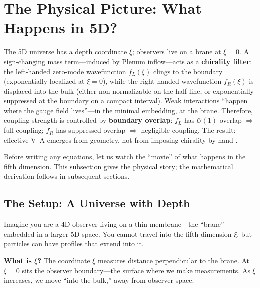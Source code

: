 \section{The Physical Picture: What Happens in 5D?}
\label{sec:ch9_physical_picture}

\begin{tcolorbox}[colback=green!5!white, colframe=green!50!black,
    title=\textbf{The V--A Mechanism in One Paragraph}]
The 5D universe has a depth coordinate $\xi$; observers live on a brane at $\xi = 0$.
A sign-changing mass term---induced by Plenum inflow---acts as a \textbf{chirality
filter}: the left-handed zero-mode wavefunction $f_L(\xi)$ clings to the boundary
(exponentially localized at $\xi = 0$), while the right-handed wavefunction $f_R(\xi)$
is displaced into the bulk (either non-normalizable on the half-line, or
exponentially suppressed at the boundary on a compact interval). Weak interactions
``happen where the gauge field lives''---in the minimal embedding, at the brane.
Therefore, coupling strength is controlled by \textbf{boundary overlap}: $f_L$ has
$\mathcal{O}(1)$ overlap $\Rightarrow$ full coupling; $f_R$ has suppressed overlap
$\Rightarrow$ negligible coupling. The result: effective V--A emerges from geometry,
not from imposing chirality by hand \tagDc{}.
\end{tcolorbox}

\medskip
Before writing any equations, let us watch the ``movie'' of what happens in the
fifth dimension. This subsection gives the physical story; the mathematical
derivation follows in subsequent sections.


\subsection{The Setup: A Universe with Depth}

Imagine you are a 4D observer living on a thin membrane---the ``brane''---embedded
in a larger 5D space. You cannot travel into the fifth dimension $\xi$, but particles
can have profiles that extend into it.

\textbf{What is $\xi$?} The coordinate $\xi$ measures distance perpendicular to the
brane. At $\xi = 0$ sits the observer boundary---the surface where we make measurements.
As $\xi$ increases, we move ``into the bulk,'' away from observer space.

